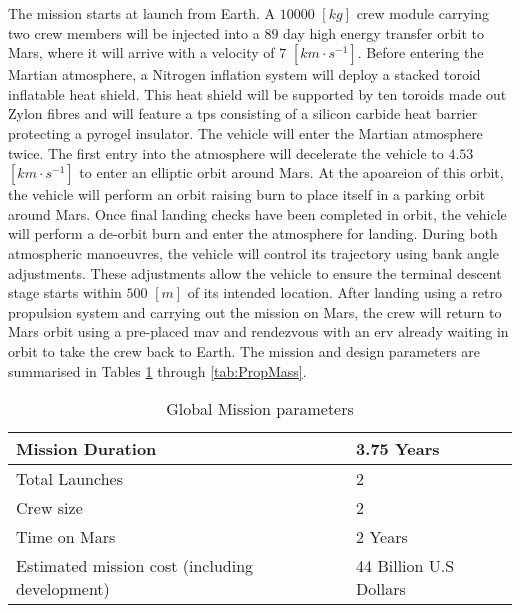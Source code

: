The mission starts at launch from Earth. A $10 000$ $[kg]$ crew module carrying two crew members will be injected into a $89$ day high energy transfer orbit to Mars, where it will arrive with a velocity of $7$ $[km\cdot s^{-1}]$. Before entering the Martian atmosphere, a Nitrogen inflation system will deploy a stacked toroid inflatable heat shield. This heat shield will be supported by ten toroids made out Zylon fibres and will feature a \gls{tps} consisting of a silicon carbide heat barrier protecting a pyrogel insulator. The vehicle will enter the Martian atmosphere twice. The first entry into the atmosphere will decelerate the vehicle to $4.53$ $[km\cdot s^{-1}]$ to enter an elliptic orbit around Mars. At the apoareion of this orbit, the vehicle will perform an orbit raising burn to place itself in a parking orbit around Mars. Once final landing checks have been completed in orbit, the vehicle will perform a de-orbit burn and enter the atmosphere for landing. During both atmospheric manoeuvres, the vehicle will control its trajectory using bank angle adjustments. These adjustments allow the vehicle to ensure the terminal descent stage starts within $500$ $[m]$ of its intended location. After landing using a retro propulsion system and carrying out the mission on Mars, the crew will return to Mars orbit using a pre-placed \gls{mav} and rendezvous with an \gls{erv} already waiting in orbit to take the crew back to Earth. The mission and design parameters are summarised in Tables \ref{tab:MissionPar} through \ref{tab:PropMass}.


\begin{table}
	\centering
	\caption{Global Mission parameters}
	\label{tab:MissionPar}
	\begin{tabular}{|l|l|} \hline
		Mission Duration				             	& 	3.75 Years						\\ \hline 
		Total Launches       							&	2  		   	  					\\ \hline
		Crew size				 						&	2     	  						\\ \hline
		Time on Mars				              	   	&  	2 Years    						\\ \hline
		Estimated mission cost (including development) 	&  	44 Billion U.S Dollars			\\ \hline
	\end{tabular}
\end{table}

